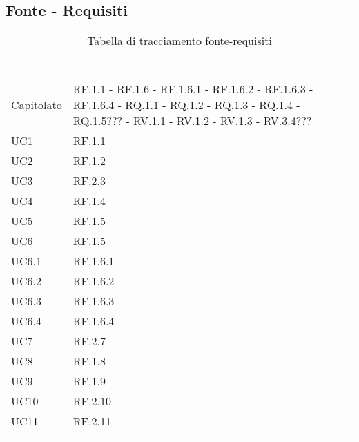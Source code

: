 \subsection{Fonte - Requisiti}
\begin{center}
  \centering
  \begin{longtable}{|C{6cm}|C{6cm}|}
    \hline
    \textcolor[HTML]{FFFFFF}{\textbf{Fonte}} & \textcolor[HTML]{FFFFFF}{\textbf{Requisiti}} \\ \hline
    Capitolato & RF.1.1 - RF.1.6 - RF.1.6.1 - RF.1.6.2 - RF.1.6.3 - RF.1.6.4 - RQ.1.1 - RQ.1.2 - RQ.1.3 - RQ.1.4 - RQ.1.5??? - RV.1.1 - RV.1.2 - RV.1.3 - RV.3.4??? \\ \hline
    UC1 & RF.1.1 \\ \hline
    UC2 & RF.1.2 \\ \hline
    UC3 & RF.2.3 \\ \hline
    UC4 & RF.1.4 \\ \hline
    UC5 & RF.1.5 \\ \hline
    UC6 & RF.1.5 \\ \hline
    UC6.1 & RF.1.6.1 \\ \hline
    UC6.2 & RF.1.6.2 \\ \hline
    UC6.3 & RF.1.6.3 \\ \hline
    UC6.4 & RF.1.6.4 \\ \hline
    UC7 & RF.2.7 \\ \hline
    UC8 & RF.1.8 \\ \hline
    UC9 & RF.1.9 \\ \hline
    UC10 & RF.2.10 \\ \hline
    UC11 & RF.2.11 \\ \hline

    \caption{Tabella di tracciamento fonte-requisiti}
  \end{longtable}
\end{center}

